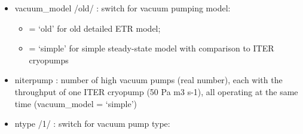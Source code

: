 \documentclass[]{article}
\begin{document}
\begin{itemize}
\item
  vacuum\_model /old/ : switch for vacuum pumping model:

  \begin{itemize}
  \itemsep1pt\parskip0pt
  \item
    = `old' for old detailed ETR model;
  \item
    = `simple' for simple steady-state model with comparison to ITER
    cryopumps
  \end{itemize}
\item
  niterpump : number of high vacuum pumps (real number), each with the
  throughput of one ITER cryopump (50 Pa m3 s-1), all operating at the
  same time (vacuum\_model = `simple')
\item
  ntype /1/ : switch for vacuum pump type:


\end{itemize}
\end{document}
